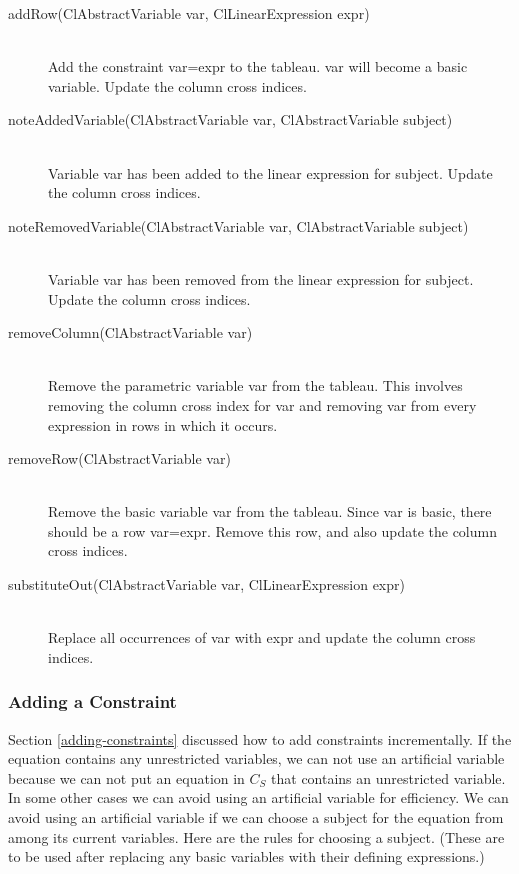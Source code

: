 \documentclass{article}
\begin{document}
\begin{description}
  

\item[{\sf addRow(ClAbstractVariable var, ClLinearExpression expr)}]  \ \\
      Add the constraint {\sf var=expr} to the tableau.  {\sf var} will
      become a basic variable.  Update the column cross indices.
      

\item[{\sf noteAddedVariable(ClAbstractVariable var, ClAbstractVariable subject)}]  \ \\
      Variable {\sf var} has been added to the linear expression for
      {\sf subject}.  Update the column cross indices.
      

\item[{\sf noteRemovedVariable(ClAbstractVariable var, ClAbstractVariable subject)}]  \ \\
      Variable {\sf var} has been removed from the linear expression for
      {\sf subject}.  Update the column cross indices.
      

\item[{\sf removeColumn(ClAbstractVariable var)}] \ \\
      Remove the parametric variable {\sf var} from the tableau.  This
      involves removing the column cross index for {\sf var} and
      removing {\sf var} from every expression in {\sf rows} in which it
      occurs.
      

\item[{\sf removeRow(ClAbstractVariable var)}] \ \\
      Remove the basic variable {\sf var} from the tableau.  Since {\sf
        var} is basic, there should be a row {\sf var=expr}.  Remove
      this row, and also update the column cross indices.
      

\item[{\sf substituteOut(ClAbstractVariable var, ClLinearExpression expr)}] \ \\
      Replace all occurrences of {\sf var} with {\sf expr} and update the
      column cross indices.

\end{description}

\subsubsection{Adding a Constraint}
\label{cassowary-adding-constraints}

Section \ref{adding-constraints} discussed how to add constraints
incrementally.  If the equation contains any unrestricted variables, we can
not use an artificial variable because we can not put an equation in $C_S$
that contains an unrestricted variable.  In some other cases we can avoid
using an artificial variable for efficiency.  We can avoid using an
artificial variable if we can choose a subject for the equation from among
its current variables.  Here are the rules for choosing a subject.  (These
are to be used after replacing any basic variables with their defining
expressions.)
\end{document}
